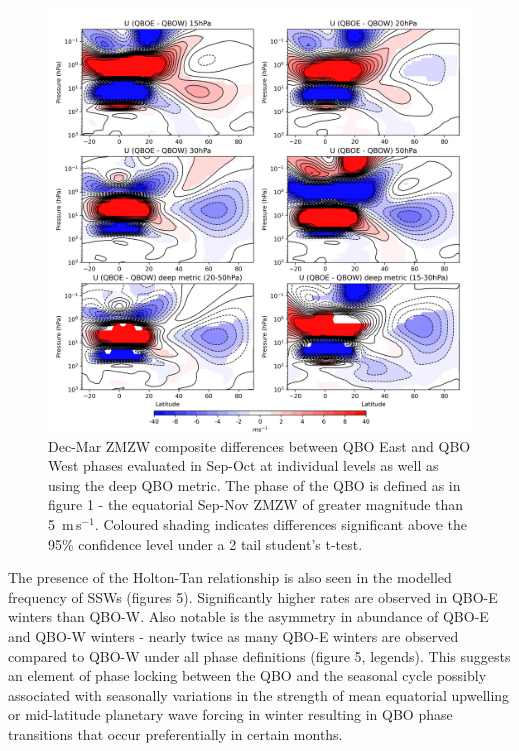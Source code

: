 \documentclass[wcd, manuscript]{copernicus}
\begin{document}
\begin{center}
\begin{figure}[h!]
\noindent\includegraphics[width = 0.85\linewidth]{figures/Holton_Tan_composite_threshold_fig2.png}
\caption{Dec-Mar ZMZW composite differences between QBO East and QBO West phases evaluated in Sep-Oct at individual levels as well as using the deep QBO metric. The phase of the QBO is defined as in figure 1 - the equatorial Sep-Nov ZMZW of greater magnitude than 5\ m\,s$^{-1}$. Coloured shading indicates differences significant above the 95\% confidence level under a 2 tail student’s t-test.}
\label{fig1}
\end{figure}
\end{center}

The presence of the Holton-Tan relationship is also seen in the modelled frequency of SSWs (figures 5). Significantly higher rates are observed in QBO-E winters than QBO-W. Also notable is the asymmetry in abundance of QBO-E and QBO-W winters - nearly twice as many QBO-E winters are observed compared to QBO-W under all phase definitions (figure 5, legends). This suggests an element of phase locking between the QBO and the seasonal cycle possibly associated with seasonally variations in the strength of mean equatorial upwelling or mid-latitude planetary wave forcing in winter \citep{Pascoe2005, Gruzdez2000, Kylash2015} resulting in QBO phase transitions that occur preferentially in certain months. 
\end{document}
